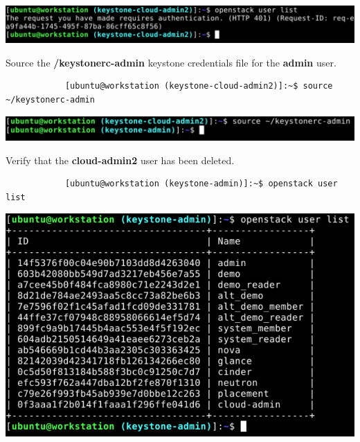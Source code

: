 \documentclass[letterpaper, 12pt]{article}
\begin{document}
\begin{enumerate}
\begin{labstep}
        \begin{center}
            \includegraphics[width=\linewidth]{images/appendix/step9.png}
        \end{center}
    \end{labstep}

    \begin{labstep}
        Source the \textbf{\texttildemid/keystonerc-admin} keystone credentials file for the \textbf{admin} user.
        \begin{lstlisting}
            [ubuntu@workstation (keystone-cloud-admin2)]:~$ source ~/keystonerc-admin
        \end{lstlisting}

        \begin{center}
            \includegraphics[width=\linewidth]{images/appendix/step10.png}
        \end{center}
    \end{labstep}

    \begin{labstep}
        Verify that the \textbf{cloud-admin2} user has been deleted.
        \begin{lstlisting}
            [ubuntu@workstation (keystone-admin)]:~$ openstack user list
        \end{lstlisting}

        \begin{center}
            \includegraphics[width=\linewidth]{images/appendix/step11.png}
        \end{center}
    \end{labstep}

\end{enumerate}
\end{document}
